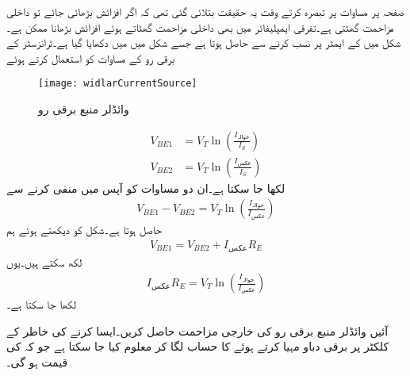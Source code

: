 صفحہ  پر مساوات  پر تبصرہ کرتے وقت یہ حقیقت بتلائی گئی تھی کہ اگر افزائش بڑھائی جائے تو داخلی مزاحمت گھٹتی ہے۔تفرقی ایمپلیفائر میں بھی داخلی مزاحمت گھٹاتے ہوئے افزائش بڑھانا ممکن ہے۔
شکل  میں  کے ایمٹر پر  نسب کرنے سے   حاصل ہوتا ہے جسے شکل  میں میں دکھایا گیا ہے۔ٹرانزسٹر کے برقی رو کے مساوات کو استعمال کرتے ہوئے 
\begin{figure}
\centering
\texttt{[image: widlarCurrentSource]}
\caption{وائڈلر منبع برقی رو}
\label{شکل_تفرقی_وائڈلر_پیداکار_برقی_رو}
\end{figure}
%
\begin{align*}
V_{BE1}&=V_T \ln \left(\frac{I_{\textrm{حوالہ}}}{I_S} \right)\\
V_{BE2}&=V_T \ln \left(\frac{I_{\textrm{عکس}}}{I_S} \right)
\end{align*}
لکھا جا سکتا ہے۔ان دو مساوات کو آپس میں منفی کرنے سے
\begin{align*}
V_{BE1}-V_{BE2}=V_T \ln \left(\frac{I_{\textrm{حوالہ}}}{I_{\textrm{عکس}}} \right)
\end{align*}
حاصل ہوتا ہے۔شکل کو دیکھتے ہوئے ہم 
\begin{align*}
V_{BE1}=V_{BE2}+I_{\textrm{عکس}} R_E
\end{align*}
لکھ سکتے ہیں۔یوں
\begin{align}\label{مساوات_تفرقی_وائڈلر_مزاحمت}
I_{\textrm{عکس}} R_E=V_T \ln \left(\frac{I_{\textrm{حوالہ}}}{I_{\textrm{عکس}}} \right)
\end{align}
لکھا جا سکتا ہے۔

آئیں وائڈلر منبع برقی رو کی خارجی مزاحمت  حاصل کریں۔ایسا کرنے کی خاطر  کے کلکٹر پر  برقی دباو مہیا کرتے ہوئے  کا حساب لگا کر  معلوم کیا جا سکتا ہے جو کہ  کی قیمت ہو گی۔

